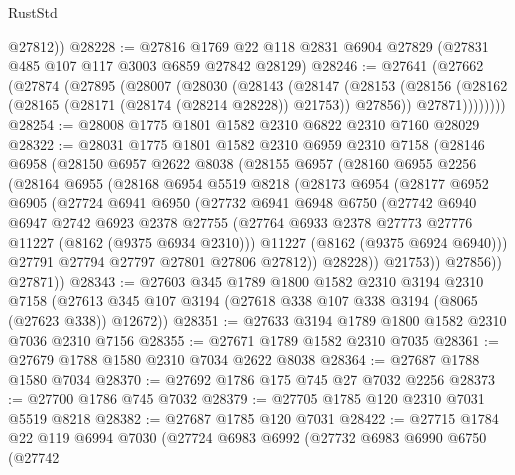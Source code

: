 \begin{lexlean}{RustStd}
\begin{coremodule}
        @27812))
@28228 := @27816 @1769 @22 @118 @2831 @6904 @27829 (@27831 @485 @107 @117 @3003 @6859 @27842 @28129)
@28246 := @27641
    (@27662
      (@27874
        (@27895
          (@28007
            (@28030
              (@28143
                (@28147
                  (@28153
                    (@28156 (@28162 (@28165 (@28171 (@28174 (@28214 @28228)) @21753)) @27856))
                    @27871))))))))
@28254 := @28008 @1775 @1801 @1582 @2310 @6822 @2310 @7160 @28029
@28322 := @28031
    @1775
    @1801
    @1582
    @2310
    @6959
    @2310
    @7158
    (@28146
      @6958
      (@28150
        @6957
        @2622
        @8038
        (@28155
          @6957
          (@28160
            @6955
            @2256
            (@28164
              @6955
              (@28168
                @6954
                @5519
                @8218
                (@28173
                  @6954
                  (@28177
                    @6952
                    @6905
                    (@27724
                      @6941
                      @6950
                      (@27732
                        @6941
                        @6948
                        @6750
                        (@27742
                          @6940
                          @6947
                          @2742
                          @6923
                          @2378
                          @27755
                          (@27764 @6933 @2378 @27773 @27776 @11227 (@8162 (@9375 @6934 @2310)))
                          @11227
                          (@8162 (@9375 @6924 @6940)))
                        @27791
                        @27794
                        @27797
                        @27801
                        @27806
                        @27812))
                    @28228))
                @21753))
            @27856))
        @27871))
@28343 := @27603
    @345
    @1789
    @1800
    @1582
    @2310
    @3194
    @2310
    @7158
    (@27613 @345 @107 @3194 (@27618 @338 @107 @338 @3194 (@8065 (@27623 @338)) @12672))
@28351 := @27633 @3194 @1789 @1800 @1582 @2310 @7036 @2310 @7156
@28355 := @27671 @1789 @1582 @2310 @7035
@28361 := @27679 @1788 @1580 @2310 @7034 @2622 @8038
@28364 := @27687 @1788 @1580 @7034
@28370 := @27692 @1786 @175 @745 @27 @7032 @2256
@28373 := @27700 @1786 @745 @7032
@28379 := @27705 @1785 @120 @2310 @7031 @5519 @8218
@28382 := @27687 @1785 @120 @7031
@28422 := @27715
    @1784
    @22
    @119
    @6994
    @7030
    (@27724
      @6983
      @6992
      (@27732
        @6983
        @6990
        @6750
        (@27742

\end{coremodule}
\end{lexlean}
